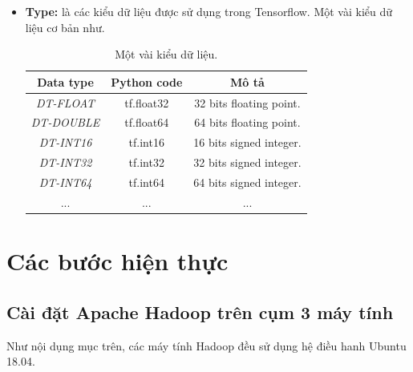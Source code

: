 \begin{itemize}
		\item \textbf{Type:} là các kiểu dữ liệu được sử dụng trong Tensorflow. Một vài kiểu dữ liệu cơ bản như.\\
		\begin{table}[h!]
			\centering
			\begin{tabular}{ | c | c | c | }
 			\hline
 			 \textbf{Data type} & \textbf{Python code} & \textbf{Mô tả}\\
 			\hline
 			\textit{DT-FLOAT}  & tf.float32  & 32 bits floating point.  \\
			\hline
			\textit{DT-DOUBLE} & tf.float64 & 64 bits floating point.\\
			\hline
			\textit{DT-INT16} & tf.int16	 & 16 bits signed integer.\\
			\hline
			\textit{DT-INT32} & tf.int32	 & 32 bits signed integer.	\\
			\hline
			\textit{DT-INT64} & tf.int64	 & 64 bits signed integer. \\
			\hline
			... & ... & ...\\
			\hline
			
		\end{tabular}
		\caption{Một vài kiểu dữ liệu.}
		\label{table:type}
		\end{table}
		\pagebreak
		
		
	\end{itemize}
	
	

\section{Các bước hiện thực}

	\subsection{Cài đặt Apache Hadoop trên cụm 3 máy tính}
	Như nội dụng mục trên, các máy tính Hadoop đều sử dụng hệ điều hanh Ubuntu 18.04.\par
	
